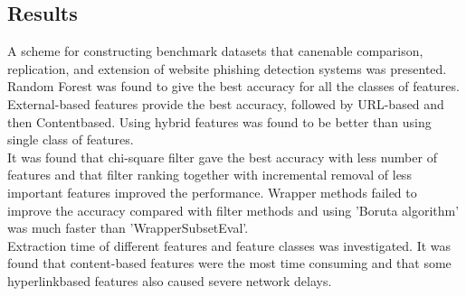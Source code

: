 \subsection{Results}
A scheme for constructing benchmark datasets that canenable comparison, replication, and extension of website phishing detection systems was presented.\\
Random Forest was found to give the best accuracy for all the classes of features. External-based features provide the best accuracy, followed by URL-based and then Contentbased. Using hybrid features was found to be better than
using single class of features.\\
It was found that chi-square filter gave the best accuracy with less number of features and that filter ranking together with incremental removal of less important features improved the performance. Wrapper methods failed to improve the accuracy compared with filter methods and using ’Boruta algorithm’ was much faster than ’WrapperSubsetEval’.\\
Extraction time of different features and feature classes was investigated. It was found that content-based features were the most time consuming and that some hyperlinkbased features also caused severe network delays.

